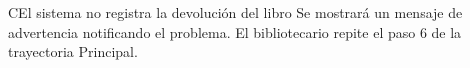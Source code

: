 		\begin{UCtrayectoriaA}{C}{El sistema no registra la devolución del libro}
			\UCpaso[\UCsist] Se mostrará un mensaje de advertencia notificando el problema. 
			\UCpaso[\UCactor]El bibliotecario repite el paso 6 de la trayectoria Principal.
		\end{UCtrayectoriaA}

